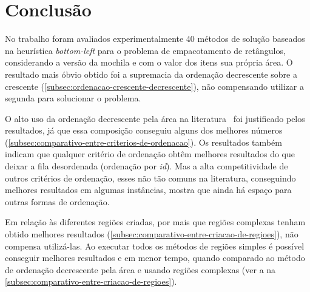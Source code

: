 \section{Conclusão}\label{sec:conclusao}

No trabalho foram avaliados experimentalmente 40 métodos de solução baseados na heurística
\textit{bottom-left} para o problema de empacotamento de retângulos, considerando a versão da
mochila e com o valor dos itens sua própria área.
O resultado mais óbvio obtido foi a supremacia da ordenação decrescente sobre a crescente
(\cref{subsec:ordenacao-crescente-decrescente}), não compensando utilizar a segunda para solucionar o
problema.

O alto uso da ordenação decrescente pela área na literatura~\cite{chen2019efficient} foi justificado
pelos resultados, já que essa composição conseguiu alguns dos melhores números
(\cref{subsec:comparativo-entre-criterios-de-ordenacao}).
Os resultados também indicam que qualquer critério de ordenação obtêm melhores resultados do que
deixar a fila desordenada (ordenação por \textit{id}).
Mas a alta competitividade de outros critérios de ordenação, esses não tão comuns na literatura,
conseguindo melhores resultados em algumas instâncias, mostra que ainda há espaço para outras
formas de ordenação.

Em relação às diferentes regiões criadas, por mais que regiões complexas tenham obtido melhores
resultados (\cref{subsec:comparativo-entre-criacao-de-regioes}), não compensa utilizá-las.
Ao executar todos os métodos de regiões simples é possível conseguir melhores resultados e em menor
tempo, quando comparado ao método de ordenação decrescente pela área e usando regiões complexas
(ver a  na \cref{subsec:comparativo-entre-criacao-de-regioes}).
